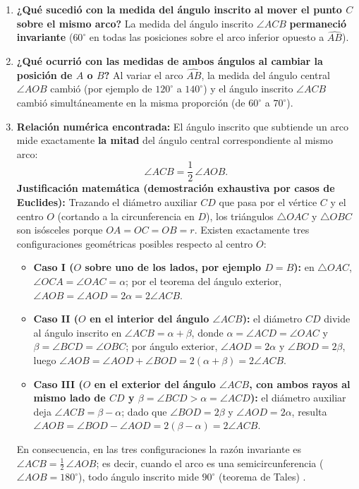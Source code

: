 \documentclass[spanish,letterpaper,oneside]{article}
\begin{document}
\begin{enumerate}
  \item[\textbf{a.}] \textbf{¿Qué sucedió con la medida del ángulo inscrito al mover el punto $C$ sobre el mismo arco?} La medida del ángulo inscrito $\angle ACB$ \textbf{permaneció invariante} ($60^\circ$ en todas las posiciones sobre el arco inferior opuesto a $\widehat{AB}$).
  \item[\textbf{b.}] \textbf{¿Qué ocurrió con las medidas de ambos ángulos al cambiar la posición de $A$ o $B$?} Al variar el arco $\widehat{AB}$, la medida del ángulo central $\angle AOB$ cambió (por ejemplo de $120^\circ$ a $140^\circ$) y el ángulo inscrito $\angle ACB$ cambió simultáneamente en la misma proporción (de $60^\circ$ a $70^\circ$).
  \item[\textbf{c.}] \textbf{Relación numérica encontrada:} El ángulo inscrito que subtiende un arco mide exactamente \textbf{la mitad} del ángulo central correspondiente al mismo arco:
  \[
    \angle ACB = \frac{1}{2}\,\angle AOB.
  \]
  \textbf{Justificación matemática (demostración exhaustiva por casos de Euclides):} Trazando el diámetro auxiliar $CD$ que pasa por el vértice $C$ y el centro $O$ (cortando a la circunferencia en $D$), los triángulos $\triangle OAC$ y $\triangle OBC$ son isósceles porque $OA = OC = OB = r$. Existen exactamente tres configuraciones geométricas posibles respecto al centro $O$:
  \begin{itemize}
    \item \textbf{Caso I ($O$ sobre uno de los lados, por ejemplo $D = B$):} en $\triangle OAC$, $\angle OCA = \angle OAC = \alpha$; por el teorema del ángulo exterior, $\angle AOB = \angle AOD = 2\alpha = 2\angle ACB$.
    \item \textbf{Caso II ($O$ en el interior del ángulo $\angle ACB$):} el diámetro $CD$ divide al ángulo inscrito en $\angle ACB = \alpha + \beta$, donde $\alpha = \angle ACD = \angle OAC$ y $\beta = \angle BCD = \angle OBC$; por ángulo exterior, $\angle AOD = 2\alpha$ y $\angle BOD = 2\beta$, luego $\angle AOB = \angle AOD + \angle BOD = 2(\alpha + \beta) = 2\angle ACB$.
    \item \textbf{Caso III ($O$ en el exterior del ángulo $\angle ACB$, con ambos rayos al mismo lado de $CD$ y $\beta = \angle BCD > \alpha = \angle ACD$):} el diámetro auxiliar deja $\angle ACB = \beta - \alpha$; dado que $\angle BOD = 2\beta$ y $\angle AOD = 2\alpha$, resulta $\angle AOB = \angle BOD - \angle AOD = 2(\beta - \alpha) = 2\angle ACB$.
  \end{itemize}
  En consecuencia, en las tres configuraciones la razón invariante es $\angle ACB = \frac{1}{2}\,\angle AOB$; es decir, cuando el arco es una semicircunferencia ($\angle AOB = 180^\circ$), todo ángulo inscrito mide $90^\circ$ (teorema de Tales) \citep{euclides_elementos}.
\end{enumerate}
\end{document}
